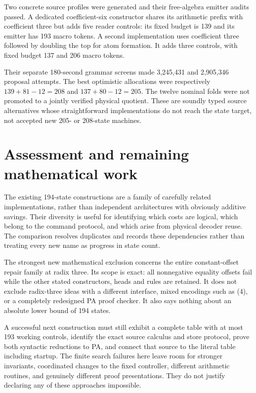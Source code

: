 \documentclass[11pt,letterpaper]{article}
\begin{document}
Two concrete source profiles were generated and their free-algebra
emitter audits passed. A dedicated coefficient-six constructor shares
its arithmetic prefix with coefficient three but adds five reader
controls: its fixed budget is 139 and its emitter has 193 macro tokens.
A second implementation uses coefficient three followed by doubling the
top for atom formation. It adds three controls, with fixed budget 137
and 206 macro tokens.

Their separate 180-second grammar screens made 3,245,431 and 2,905,346
proposal attempts. The best optimistic allocations were respectively
$139+81-12=208$ and $137+80-12=205$. The twelve nominal folds were not
promoted to a jointly verified physical quotient. These are soundly typed
source alternatives whose straightforward implementations do not reach
the state target, not accepted new 205- or 208-state machines.

\section{Assessment and remaining mathematical work}

The existing 194-state constructions are a family of carefully related
implementations, rather than independent architectures with obviously
additive savings. Their diversity is useful for identifying which costs
are logical, which belong to the command protocol, and which arise from
physical decoder reuse. The comparison resolves duplicates and records
these dependencies rather than treating every new name as progress in
state count.

The strongest new mathematical exclusion concerns the entire
constant-offset repair family at radix three. Its scope is exact: all
nonnegative equality offsets fail while the other stated constructors,
heads and rules are retained. It does not exclude radix-three ideas with
a different interface, mixed encodings such as (4), or a completely
redesigned PA proof checker. It also says nothing about an absolute lower
bound of 194 states.

A successful next construction must still exhibit a complete table with
at most 193 working controls, identify the exact source calculus and store
protocol, prove both syntactic reductions to PA, and connect that source
to the literal table including startup. The finite search failures here
leave room for stronger invariants, coordinated changes to the fixed
controller, different arithmetic routines, and genuinely different proof
presentations. They do not justify declaring any of these approaches
impossible.
\end{document}
